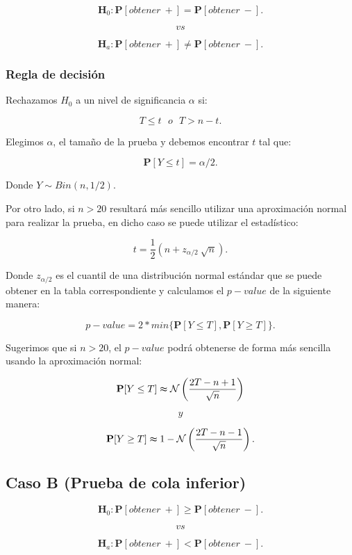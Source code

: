 \documentclass[
  a4paper,
  oneside,
  openany]{book}
\begin{document}
\[\textbf{H}_0: \mathbf{P}[obtener\ +]= \mathbf{P}[obtener\ -].\]

\[vs\]

\[\textbf{H}_a: \mathbf{P}[obtener\ +] \neq \mathbf{P}[obtener\ -].\]

\hypertarget{regla-de-decisiuxf3n-10}{%
\subsubsection*{Regla de decisión}\label{regla-de-decisiuxf3n-10}}


Rechazamos \(H_0\) a un nivel de significancia \(\alpha\) si:

\[T \leq t \ \ \  o \ \ \ T>n-t.\]

Elegimos \(\alpha\), el tamaño de la prueba y debemos encontrar \(t\) tal que:

\[\mathbf{P}[Y \leq t]=\alpha/2.\]

Donde \(Y \sim Bin (n,1/2)\).

Por otro lado, si \(n>20\) resultará más sencillo utilizar una aproximación normal para realizar la prueba, en dicho caso se puede utilizar el estadístico:

\[t=\frac{1}{2}\left(n+z_{\alpha/2}\ \sqrt{n}\right).\]

Donde \(z_{\alpha/2}\) es el cuantil de una distribución normal estándar que se puede obtener en la tabla correspondiente y calculamos el \(p-value\) de la siguiente manera:

\[p-value=2*min\{\mathbf{P}[Y\leq T],\mathbf{P}[Y\geq T]\}.\]

Sugerimos que si \(n>20\), el \(p-value\) podrá obtenerse de forma más sencilla usando la aproximación normal:

\[\mathbf{P}[Y\leq T] \thickapprox  \mathcal{N} \left(\frac{2T-n+1}{\sqrt{n}}\right)\]

\[y\]

\[\mathbf{P}[Y\geq T] \thickapprox 1- \mathcal{N} \left(\frac{2T-n-1}{\sqrt{n}}\right).\]

\hypertarget{caso-b-prueba-de-cola-inferior-3}{%
\subsection*{Caso B (Prueba de cola inferior)}\label{caso-b-prueba-de-cola-inferior-3}}


\[\textbf{H}_0: \mathbf{P}[obtener\ +] \geq \mathbf{P}[obtener\ -].\]

\[vs\]

\[\textbf{H}_a: \mathbf{P}[obtener\ +] < \mathbf{P}[obtener\ -].\]
\end{document}
